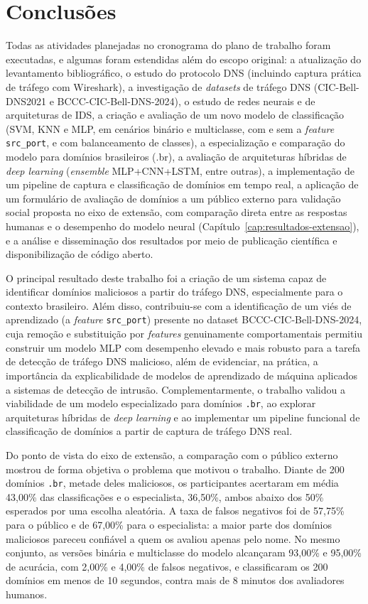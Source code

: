 \chapter{Conclusões}
\label{cap:conclusao}

Todas as atividades planejadas no cronograma do plano de trabalho foram executadas, e algumas foram estendidas além do escopo original: a atualização do levantamento bibliográfico, o estudo do protocolo DNS (incluindo captura prática de tráfego com Wireshark), a investigação de \textit{datasets} de tráfego DNS (CIC-Bell-DNS2021 e BCCC-CIC-Bell-DNS-2024), o estudo de redes neurais e de arquiteturas de IDS, a criação e avaliação de um novo modelo de classificação (SVM, KNN e MLP, em cenários binário e multiclasse, com e sem a \textit{feature} \texttt{src\_port}, e com balanceamento de classes), a especialização e comparação do modelo para domínios brasileiros (.br), a avaliação de arquiteturas híbridas de \textit{deep learning} (\textit{ensemble} MLP+CNN+LSTM, entre outras), a implementação de um pipeline de captura e classificação de domínios em tempo real, a aplicação de um formulário de avaliação de domínios a um público externo para validação social proposta no eixo de extensão, com comparação direta entre as respostas humanas e o desempenho do modelo neural (Capítulo~\ref{cap:resultados-extensao}), e a análise e disseminação dos resultados por meio de publicação científica e disponibilização de código aberto.

O principal resultado deste trabalho foi a criação de um sistema capaz de identificar domínios maliciosos a partir do tráfego DNS, especialmente para o contexto brasileiro. Além disso, contribuiu-se com a identificação de um viés de aprendizado (a \textit{feature} \texttt{src\_port}) presente no dataset BCCC-CIC-Bell-DNS-2024, cuja remoção e substituição por \textit{features} genuinamente comportamentais permitiu construir um modelo MLP com desempenho elevado e mais robusto para a tarefa de detecção de tráfego DNS malicioso, além de evidenciar, na prática, a importância da explicabilidade de modelos de aprendizado de máquina aplicados a sistemas de detecção de intrusão. Complementarmente, o trabalho validou a viabilidade de um modelo especializado para domínios \texttt{.br}, ao explorar arquiteturas híbridas de \textit{deep learning} e ao implementar um pipeline funcional de classificação de domínios a partir de captura de tráfego DNS real.

Do ponto de vista do eixo de extensão, a comparação com o público externo mostrou de forma objetiva o problema que motivou o trabalho. Diante de 200 domínios \texttt{.br}, metade deles maliciosos, os participantes acertaram em média 43,00\% das classificações e o especialista, 36,50\%, ambos abaixo dos 50\% esperados por uma escolha aleatória. A taxa de falsos negativos foi de 57,75\% para o público e de 67,00\% para o especialista: a maior parte dos domínios maliciosos pareceu confiável a quem os avaliou apenas pelo nome. No mesmo conjunto, as versões binária e multiclasse do modelo alcançaram 93,00\% e 95,00\% de acurácia, com 2,00\% e 4,00\% de falsos negativos, e classificaram os 200 domínios em menos de 10 segundos, contra mais de 8 minutos dos avaliadores humanos.

